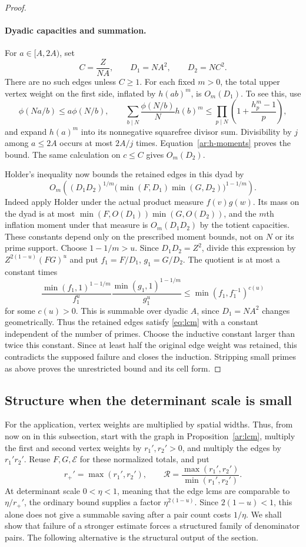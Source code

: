 \begin{proof}
\paragraph{Dyadic capacities and summation.}
For $a\in[A,2A)$, set
\[
 C=\frac Z{NA},\qquad D_1=NA^2,\qquad D_2=NC^2.
\]
There are no such edges unless $C\ge1$. For each fixed $m>0$, the total
upper vertex weight on the first side, inflated by $h(ab)^m$, is
$O_m(D_1)$. To see this, use
\[
 \phi(Na/b)\le a\phi(N/b),\qquad
 \sum_{b\mid N}\frac{\phi(N/b)}N h(b)^m
 \le\prod_{p\mid N}\left(1+\frac{h_p^m-1}{p}\right),
\]
and expand $h(a)^m$ into its nonnegative squarefree divisor sum.
Divisibility by $j$ among $a\le2A$ occurs at most $2A/j$ times.
Equation~\eqref{ar:h-moments} proves the bound. The same calculation
on $c\le C$ gives $O_m(D_2)$.

Holder's inequality now bounds the retained edges in this dyad by
\[
 O_m\left((D_1D_2)^{1/m}
   \bigl(\min(F,D_1)\min(G,D_2)\bigr)^{1-1/m}\right).
\]
Indeed apply Holder under the actual product measure $f(v)g(w)$.
Its mass on the dyad is at most
$\min(F,O(D_1))\min(G,O(D_2))$, and the $m$th inflation moment under
that measure is $O_m(D_1D_2)$ by the totient capacities. These constants
depend only on the prescribed moment bounds, not on $N$ or its prime
support.
Choose $1-1/m>u$. Since $D_1D_2=Z^2$, divide this expression by
$Z^{2(1-u)}(FG)^u$ and put $f_1=F/D_1$, $g_1=G/D_2$. The quotient is
at most a constant times
\[
 \frac{\min(f_1,1)^{1-1/m}}{f_1^u}
 \frac{\min(g_1,1)^{1-1/m}}{g_1^u}
 \le\min(f_1,f_1^{-1})^{c(u)}
\]
for some $c(u)>0$. This is summable over dyadic $A$, since $D_1=NA^2$
changes geometrically. Thus the retained edges satisfy
\eqref{eq:lcm} with a constant independent of the number of primes.
Choose the inductive constant larger than twice this constant. Since
at least half the original edge weight was retained, this contradicts
the supposed failure and closes the induction. Stripping small primes
as above proves the unrestricted bound and its cell form.
\end{proof}

\subsection{Structure when the determinant scale is small}

For the application, vertex weights are multiplied by spatial widths.
Thus, from now on in this subsection, start with the graph in
Proposition~\ref{ar:lcm}, multiply the first and second vertex weights
by $r_1',r_2'>0$, and multiply the edges by $r_1'r_2'$. Reuse
$F,G,\mathcal E$ for these normalized totals, and put
\[
 r_+'=\max(r_1',r_2'),\qquad
 \mathcal R=\frac{\max(r_1',r_2')}{\min(r_1',r_2')}.
\]
At determinant scale $0<\eta<1$, meaning that the edge lcms are
comparable to $\eta/r_+'$, the ordinary bound supplies a factor
$\eta^{2(1-u)}$. Since $2(1-u)<1$, this alone does not give a summable
saving after a pair count costs $1/\eta$. We shall show that failure
of a stronger estimate forces a structured family of denominator pairs.
The following alternative is the structural output of the section.

